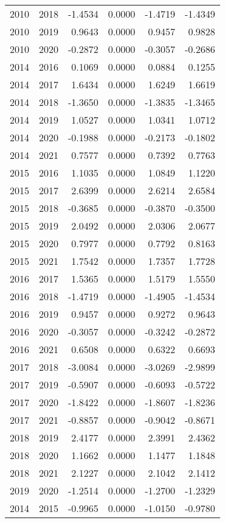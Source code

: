 \begin{tabular}{llrrrr}
2010 & 2018 & -1.4534 & 0.0000 & -1.4719 & -1.4349 \\
2010 & 2019 & 0.9643 & 0.0000 & 0.9457 & 0.9828 \\
2010 & 2020 & -0.2872 & 0.0000 & -0.3057 & -0.2686 \\
2014 & 2016 & 0.1069 & 0.0000 & 0.0884 & 0.1255 \\
2014 & 2017 & 1.6434 & 0.0000 & 1.6249 & 1.6619 \\
2014 & 2018 & -1.3650 & 0.0000 & -1.3835 & -1.3465 \\
2014 & 2019 & 1.0527 & 0.0000 & 1.0341 & 1.0712 \\
2014 & 2020 & -0.1988 & 0.0000 & -0.2173 & -0.1802 \\
2014 & 2021 & 0.7577 & 0.0000 & 0.7392 & 0.7763 \\
2015 & 2016 & 1.1035 & 0.0000 & 1.0849 & 1.1220 \\
2015 & 2017 & 2.6399 & 0.0000 & 2.6214 & 2.6584 \\
2015 & 2018 & -0.3685 & 0.0000 & -0.3870 & -0.3500 \\
2015 & 2019 & 2.0492 & 0.0000 & 2.0306 & 2.0677 \\
2015 & 2020 & 0.7977 & 0.0000 & 0.7792 & 0.8163 \\
2015 & 2021 & 1.7542 & 0.0000 & 1.7357 & 1.7728 \\
2016 & 2017 & 1.5365 & 0.0000 & 1.5179 & 1.5550 \\
2016 & 2018 & -1.4719 & 0.0000 & -1.4905 & -1.4534 \\
2016 & 2019 & 0.9457 & 0.0000 & 0.9272 & 0.9643 \\
2016 & 2020 & -0.3057 & 0.0000 & -0.3242 & -0.2872 \\
2016 & 2021 & 0.6508 & 0.0000 & 0.6322 & 0.6693 \\
2017 & 2018 & -3.0084 & 0.0000 & -3.0269 & -2.9899 \\
2017 & 2019 & -0.5907 & 0.0000 & -0.6093 & -0.5722 \\
2017 & 2020 & -1.8422 & 0.0000 & -1.8607 & -1.8236 \\
2017 & 2021 & -0.8857 & 0.0000 & -0.9042 & -0.8671 \\
2018 & 2019 & 2.4177 & 0.0000 & 2.3991 & 2.4362 \\
2018 & 2020 & 1.1662 & 0.0000 & 1.1477 & 1.1848 \\
2018 & 2021 & 2.1227 & 0.0000 & 2.1042 & 2.1412 \\
2019 & 2020 & -1.2514 & 0.0000 & -1.2700 & -1.2329 \\
2014 & 2015 & -0.9965 & 0.0000 & -1.0150 & -0.9780 \\

\end{tabular}
